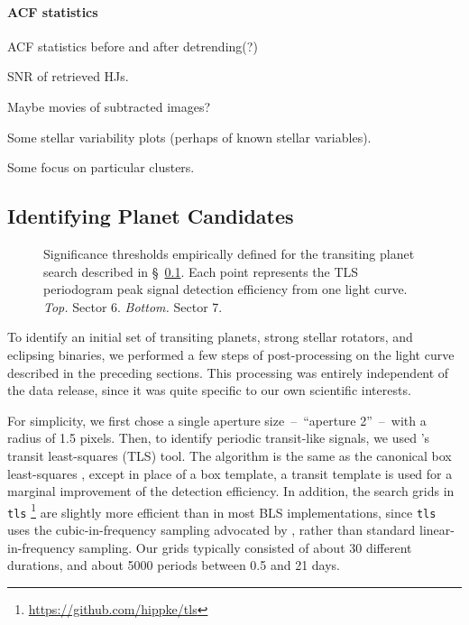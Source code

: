 \documentclass[12pt,twocolumn,tighten]{aastex62}
\begin{document}
\paragraph{ACF statistics}
ACF statistics before and after detrending(?)

SNR of retrieved HJs.

Maybe movies of subtracted images?

Some stellar variability plots (perhaps of known stellar variables).

Some focus on particular clusters.

\subsection{Identifying Planet Candidates}
\label{subsec:identifying_ctois}

\begin{figure}[!t]
	\vspace{-0.8cm}
	\vspace{-0.8cm}
	\caption{
		Significance thresholds empirically defined for the transiting
		planet search described in \S~\ref{subsec:identifying_ctois}.
		Each point represents the TLS periodogram peak signal
		detection efficiency from one light curve.  {\it Top.} Sector
		6.  {\it Bottom.} Sector 7.
	}
	\label{fig:tlsresults}
\end{figure}


To identify an initial set of transiting planets, strong stellar
rotators, and eclipsing binaries, we performed a few steps of
post-processing on the light curve described in the preceding
sections.  This processing was entirely independent of the data
release, since it was quite specific to our own scientific interests.

For simplicity, we first chose a single aperture size~--~``aperture
2''~--~with a radius of 1.5  pixels.  Then, to identify periodic
transit-like signals, we used \citet{hippke_TLS_2019}'s transit
least-squares (TLS) tool.  The algorithm is the same as the canonical
box least-squares \citep{kovacs_box-fitting_2002}, except in place of
a box template, a transit template is used  for a marginal improvement
of the detection efficiency.  In addition, the search grids in
\texttt{tls} \footnote{\url{https://github.com/hippke/tls}} are
slightly more efficient than in most BLS implementations, since
\texttt{tls} uses the cubic-in-frequency sampling advocated by
\citet{ofir_optimizing_2014}, rather than standard linear-in-frequency
sampling.  Our grids typically consisted of about 30 different
durations, and about 5000 periods between 0.5 and 21 days. 
\end{document}
